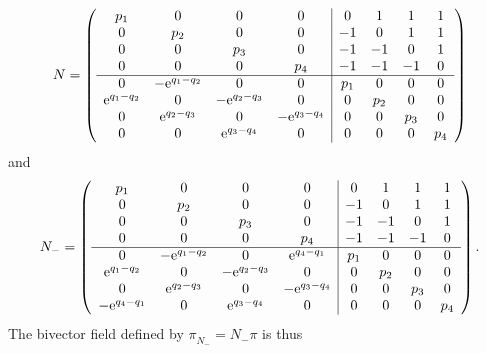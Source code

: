 \documentclass[12pt]{article}
\begin{document}
\begin{equation*}
N=
\left(\begin {array}{cccc|cccc} 
p_{{1}}&0&0&0&0&1&1&1\\ 
0&p_{{2}}&0&0&-1&0&1&1\\ 
0&0&p_{{3}}&0&-1&-1&0&1\\ 
0&0&0&p_{{4}}&-1&-1&-1&0\\ 
\hline
0&-{{\rm e}^{q_{{1}}-q_{{2}}}}&0& 0 &p_{{1}}&0&0&0\\ 
{{\rm e}^{q_{{1}}-q_{{2}}}}&0&-{{\rm e}^{q_{{2}}-q_{{3}}}}&0&0&p_{{2}}&0&0\\ 
0&{{\rm e}^{q_{{2}}-q_{{3}}}}&0&-{{\rm e}^{q_{{3}}-q_{{4}}}}&0&0&p_{{3}}&0\\ 
0&0&{{\rm e}^{q_{{3}}-q_{{4}}}}&0&0&0&0&p_{{4}}
\end {array}\right)
\end{equation*}
and
\begin{equation*}
N_-=%
\left(\begin {array}{cccc|cccc} 
p_{{1}}&0&0&0&0&1&1&1\\ 
0&p_{{2}}&0&0&-1&0&1&1\\ 
0&0&p_{{3}}&0&-1&-1&0&1\\ 
0&0&0&p_{{4}}&-1&-1&-1&0\\ 
\hline
0&-{{\rm e}^{q_{{1}}-q_{{2}}}}&0& {{\rm e}^{q_{{4}}-q_{{1}}}}&p_{{1}}&0&0&0\\ 
{{\rm e}^{q_{{1}}-q_{{2}}}}&0&-{{\rm e}^{q_{{2}}-q_{{3}}}}&0&0&p_{{2}}&0&0\\ 
0&{{\rm e}^{q_{{2}}-q_{{3}}}}&0&-{{\rm e}^{q_{{3}}-q_{{4}}}}&0&0&p_{{3}}&0\\ 
-{{\rm e}^{q_{{4}}-q_{{1}}}}&0&{{\rm e}^{q_{{3}}-q_{{4}}}}&0&0&0&0&p_{{4}}
\end {array}\right).
\end{equation*}
The bivector field %
defined by $\pi_{N_-}^{\phantom{\sharp}}%
=N_-\pi%
$ is thus
\end{document}
